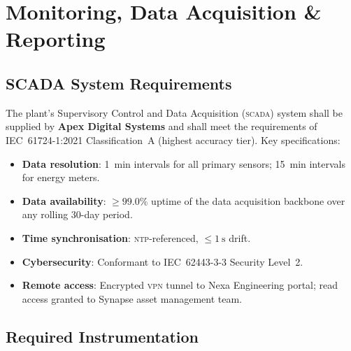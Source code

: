 
\section{Monitoring, Data Acquisition \& Reporting}

\subsection{SCADA System Requirements}

The plant's Supervisory Control and Data Acquisition (\textsc{scada}) system shall be supplied
by \textbf{Apex Digital Systems} and shall meet the requirements of IEC~61724-1:2021
Classification~A (highest accuracy tier). Key specifications:

\begin{itemize}[leftmargin=1.4em, itemsep=3pt]
  \item \textbf{Data resolution}: \SI{1}{\minute} intervals for all primary sensors;
        \SI{15}{\minute} intervals for energy meters.
  \item \textbf{Data availability}: $\geq 99.0\%$ uptime of the data acquisition backbone
        over any rolling 30-day period.
  \item \textbf{Time synchronisation}: \textsc{ntp}-referenced, $\leq \SI{1}{\second}$ drift.
  \item \textbf{Cybersecurity}: Conformant to IEC~62443-3-3 Security Level~2.
  \item \textbf{Remote access}: Encrypted \textsc{vpn} tunnel to Nexa Engineering portal;
        read access granted to Synapse asset management team.
\end{itemize}

\subsection{Required Instrumentation}

